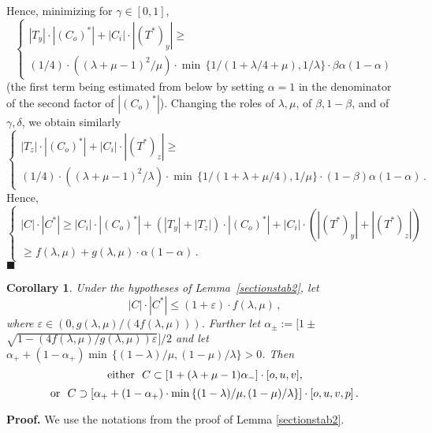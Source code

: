 \documentclass[12pt]{article}
\newtheorem{Cor}[Thm]{Corollary}
\begin{document}
Hence, minimizing for $\gamma  \in [0,1]$,
$$
\begin{cases}
|T_y| \cdot |(C_o)^*| +|C_i| \cdot |(T^*)_y| \ge \\
(1/4) \cdot \left( ( \lambda + \mu -1)^2 / \mu \right) \cdot
\min \, \{ 1/(1+\lambda /4 +\mu ), 1/ \lambda \}
\cdot \beta \alpha (1 - \alpha )
\end{cases}
$$
(the first term being estimated from below by setting $\alpha =1$ in the
denominator of the second factor of $|(C_o)^*|$).
Changing the roles of $\lambda, \mu $, 
of $\beta , 1- \beta $, and of $ \gamma ,
\delta $, we obtain similarly
$$
\begin{cases}
|T_z| \cdot |(C_o)^*| +|C_i| \cdot |(T^*)_z| \ge \\
(1/4) \cdot \left( ( \lambda + \mu -1)^2 / \lambda \right) \cdot 
\min \, \{ 1/(1+\lambda  +\mu /4), 1/ \mu \}
\cdot (1-\beta )\alpha (1 - \alpha )\,.
\end{cases}
$$
Hence, 
$$ 
\begin{cases}
|C| \cdot |C^*| \ge |C_i| \cdot |(C_o)^*| + 
(|T_y|+|T_z|) \cdot |(C_o)^*| +|C_i| \cdot (|(T^*)_y|+|(T^*)_z|) \\ 
\ge f( \lambda , \mu )+g( \lambda , \mu ) \cdot \alpha (1 - \alpha )\,.
\end{cases}
$$
$\blacksquare $


\begin{Cor}
\label{sectionstab3}
Under the hypotheses of Lemma~\ref{sectionstab2}, let 
$$
|C| \cdot |C^*| \le (1+\varepsilon ) \cdot f( \lambda , \mu )\,,
$$
where $\varepsilon \in \left( 
0, g(\lambda ,\mu ) / \left( 4f(\lambda , \mu ) \right) \right)
$. Further let
$\alpha _{ \pm } := \bigl[ 1 \pm  $ 
\newline
$ {\sqrt{1-\left( 4f(\lambda , \mu )/g(\lambda ,\mu )
\right) \varepsilon }} \bigr] /2$
and let \,$\alpha _+ + (1- \alpha _+) 
\min \, \{ (1 - \lambda )/ \mu, (1 - \mu ) / \lambda \} >0$.
Then 
$$
{\text{either\,\,\,\,}} 
C \subset [1+(\lambda + \mu -1) \alpha _-] \cdot [o,u,v], 
$$
$$
{\text{or\,\,\,\,}}
C \supset [\alpha _+ + (1- \alpha _+) \cdot 
\min \, \{ (1 - \lambda )/ \mu, (1 - \mu ) / \lambda \}] \cdot [o,u,v,p]\,.
$$ 
\end{Cor}


{\bf Proof.}
We use the notations from the proof of Lemma \ref{sectionstab2}.
\end{document}
